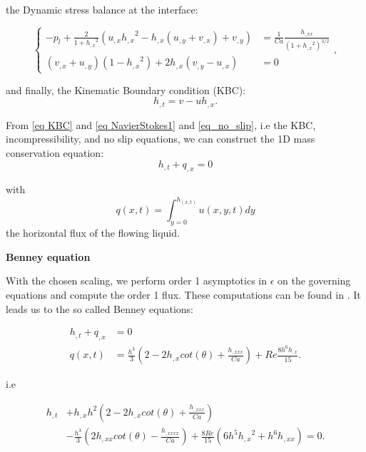 \documentclass[12pt]{article}
\begin{document}
the Dynamic stress balance at the interface: 

 

\begin{equation}\label{eq DBC}
\left\{
\begin{aligned}
    - p_l + \frac{2}{1+{h_{,x}}^2}(u_{,x}{h_{,x}}^2 - h_{,x}(u_{,y} + v_{,x})+v_{,y}) &= \frac{1}{Ca} \frac{h_{,xx}}{(1+{h_{,x}}^2)^{3/2}}\\
    (v_{,x} + u_{,y})(1-{h_{,x}}^2)+2h_{,x}(v_{,y}-u_{,x})&=0
\end{aligned}
\right.,
\end{equation}


and finally, the Kinematic Boundary condition (KBC): 
\begin{equation}\label{eq KBC}
    h_{,t} = v-uh_{,x}.
\end{equation}

From \ref{eq KBC} and \ref{eq NavierStokes1} and  \ref{eq_no_slip}, i.e the KBC, incompressibility, and no slip equations, we can construct the 1D mass conservation equation: 
\begin{equation}\label{eq mass conservation}
    h_{,t} + q_{,x} = 0
\end{equation}

with $$q(x, t) = \int_{y=0}^{h_(x, t)} u(x, y, t)dy$$ the horizontal flux of the flowing liquid.

\vspace{0.5cm}
{\textbf{Benney equation}}

With the chosen scaling, we perform order 1 asymptotics in $\epsilon$ on the governing equations and compute the order 1 flux. These computations can be found in \cite{A_Thompson_FLF_blowing_suction}. It leads us to the so called Benney equations: 

\begin{equation}
    \boxed{
\begin{aligned}
    h_{,t}+q_{,x} &= 0\\
    q(x, t) &= \frac{h^3}{3}(2-2h_{,x}cot(\theta) + \frac{h_{,xxx}}{Ca})+Re\frac{8h^6h_{,x}}{15}.
\end{aligned}
}
\end{equation}

i.e

\begin{equation}\label{Benney_eq}
\boxed{
\begin{aligned}
    h_{,t} &+ h_{,x}h^2 \left( 2-2h_{,x}cot(\theta) + \frac{h_{,xxx}}{Ca}\right) \\ &- \frac{h^3}{3}\left( 2h_{,xx}cot(\theta) - \frac{h_{,xxxx}}{Ca} \right) + \frac{8Re}{15} \left( 6h^5 {h_{,x}}^2 + h^6 h_{,xx} \right) = 0.
\end{aligned}    
}
\end{equation}
\end{document}
